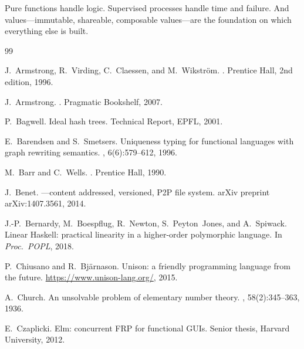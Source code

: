 \documentclass[11pt]{article}
\theoremstyle{definition}
\theoremstyle{remark}
\begin{document}
Pure functions handle logic.  Supervised processes handle time and
failure.  And values---immutable, shareable, composable values---are
the foundation on which everything else is built.



\begin{thebibliography}{99}

J.~Armstrong, R.~Virding, C.~Claessen, and M.~Wikstr\"{o}m.
.
\newblock Prentice Hall, 2nd edition, 1996.

J.~Armstrong.
.
\newblock Pragmatic Bookshelf, 2007.

P.~Bagwell.
\newblock Ideal hash trees.
\newblock Technical Report, EPFL, 2001.

E.~Barendsen and S.~Smetsers.
\newblock Uniqueness typing for functional languages with graph rewriting
  semantics.
, 6(6):579--612,
  1996.

M.~Barr and C.~Wells.
.
\newblock Prentice Hall, 1990.

J.~Benet.
---content addressed, versioned, {P2P} file system.
\newblock arXiv preprint arXiv:1407.3561, 2014.

J.-P.~Bernardy, M.~Boespflug, R.~Newton, S.~Peyton~Jones, and A.~Spiwack.
\newblock Linear {Haskell}: practical linearity in a higher-order polymorphic
  language.
\newblock In {\em Proc.\ POPL}, 2018.

P.~Chiusano and R.~Bj\"{a}rnason.
\newblock Unison: a friendly programming language from the future.
\newblock \url{https://www.unison-lang.org/}, 2015.

A.~Church.
\newblock An unsolvable problem of elementary number theory.
, 58(2):345--363, 1936.

E.~Czaplicki.
\newblock Elm: concurrent {FRP} for functional {GUI}s.
\newblock Senior thesis, Harvard University, 2012.


\end{thebibliography}
\end{document}
